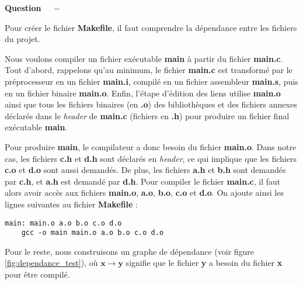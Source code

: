 \documentclass[11pt]{article}
\newcounter{question}[section]
\newenvironment{question}[1][]{\refstepcounter{question}\par\medskip
   \noindent\textbf{Question~\thequestion ~ $-$} \rmfamily}{}
\begin{document}
\begin{question} %

Pour créer le fichier \textbf{Makefile}, il faut comprendre la dépendance entre les fichiers du projet.

Nous voulons compiler un fichier exécutable \textbf{main} à partir du fichier \textbf{main.c}. Tout d'abord, rappelons qu'au minimum, le fichier \textbf{main.c} est transformé par le préprocesseur en un fichier \textbf{main.i}, compilé en un fichier assembleur \textbf{main.s}, puis en un fichier binaire \textbf{main.o}. Enfin, l'étape d'édition des liens utilise \textbf{main.o} ainsi que tous les fichiers binaires (en \textbf{.o}) des bibliothèques et des fichiers annexes déclarés dans le \textit{header} de \textbf{main.c} (fichiers en \textbf{.h}) pour produire un fichier final exécutable \textbf{main}.


Pour produire \textbf{main}, le compilateur a donc besoin du fichier \textbf{main.o}. Dans notre cas, les fichiers \textbf{c.h} et \textbf{d.h} sont déclarés en \textit{header}, ce qui implique que les fichiers \textbf{c.o} et \textbf{d.o} sont aussi demandés. De plus, les fichiers \textbf{a.h} et \textbf{b.h} sont demandés par \textbf{c.h}, et \textbf{a.h} est demandé par \textbf{d.h}. Pour compiler le fichier \textbf{main.c}, il faut alors avoir accès aux fichiers \textbf{main.o}, \textbf{a.o}, \textbf{b.o}, \textbf{c.o} et \textbf{d.o}.
On ajoute ainsi les lignes suivantes au fichier \textbf{Makefile} :
\begin{verbatim}
main: main.o a.o b.o c.o d.o
    gcc -o main main.o a.o b.o c.o d.o
\end{verbatim}

Pour le reste, nous construisons un graphe de dépendance (voir figure \ref{fig:dependance_test}), où $\mathbf{x}\rightarrow \mathbf{y}$ signifie que le fichier \textbf{y} a besoin du fichier \textbf{x} pour être compilé.



\end{question}
\end{document}
